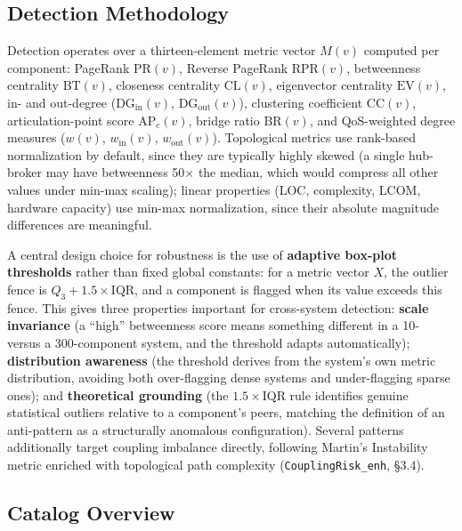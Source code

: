 \documentclass[11pt]{article}
\begin{document}
\subsection{Detection Methodology}

Detection operates over a thirteen-element metric vector $M(v)$ computed per component: PageRank
$\mathrm{PR}(v)$, Reverse PageRank $\mathrm{RPR}(v)$, betweenness centrality $\mathrm{BT}(v)$,
closeness centrality $\mathrm{CL}(v)$, eigenvector centrality $\mathrm{EV}(v)$, in- and out-degree
($\mathrm{DG}_{\text{in}}(v)$, $\mathrm{DG}_{\text{out}}(v)$), clustering coefficient
$\mathrm{CC}(v)$, articulation-point score $\mathrm{AP}_c(v)$, bridge ratio $\mathrm{BR}(v)$, and
QoS-weighted degree measures ($w(v)$, $w_{\text{in}}(v)$, $w_{\text{out}}(v)$). Topological metrics use
rank-based normalization by default, since they are typically highly skewed (a single hub-broker may
have betweenness 50$\times$ the median, which would compress all other values under min-max scaling);
linear properties (LOC, complexity, LCOM, hardware capacity) use min-max normalization, since their
absolute magnitude differences are meaningful.

A central design choice for robustness is the use of \textbf{adaptive box-plot thresholds} rather than
fixed global constants: for a metric vector $X$, the outlier fence is $Q_3 + 1.5 \times \mathrm{IQR}$,
and a component is flagged when its value exceeds this fence. This gives three properties important
for cross-system detection: \textbf{scale invariance} (a ``high'' betweenness score means something
different in a 10- versus a 300-component system, and the threshold adapts automatically);
\textbf{distribution awareness} (the threshold derives from the system's own metric distribution,
avoiding both over-flagging dense systems and under-flagging sparse ones); and \textbf{theoretical
grounding} (the $1.5 \times \mathrm{IQR}$ rule identifies genuine statistical outliers relative to a
component's peers, matching the definition of an anti-pattern as a structurally anomalous
configuration). Several patterns additionally target coupling imbalance directly, following Martin's
Instability metric \cite{Martin2003} enriched with topological path complexity
(\texttt{CouplingRisk\_enh}, \S3.4).

\subsection{Catalog Overview}
\end{document}
